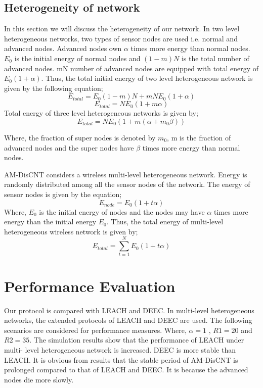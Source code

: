 \documentclass[journal]{IEEEtran}
\begin{document}
\subsection{Heterogeneity of network}
 In this section we will discuss the heterogeneity of our network. In two level heterogeneous networks, two types of sensor nodes are used i.e. normal and advanced nodes. Advanced nodes own $\alpha$ times more energy than normal nodes. $E_{0}$ is the initial energy of normal nodes and $(1-m)N$ is the total number of advanced nodes. mN number of advanced nodes are equipped with total energy of $E_{0}(1+\alpha)$. Thus, the total initial energy of two level heterogeneous network is given by the following equation;
\begin{equation}
E_{total} = E_{0}(1-m)N + mNE_{0}(1+\alpha)
\end{equation}
\begin{equation}
E_{total} = NE_{0}(1+m\alpha)
\end{equation}
 Total energy of three level heterogeneous networks is given by;
 \begin{equation}
E_{total} = NE_{0}(1+m(\alpha+m_{0}\beta))
\end{equation}

 Where, the fraction of super nodes is denoted by $m_{0}$, m is the fraction of advanced nodes and the super nodes have $\beta$ times more energy than normal nodes.

 AM-DisCNT considers a wireless multi-level heterogeneous network. Energy is randomly distributed among all the sensor nodes of the network. The energy of sensor nodes is given by the equation;
\begin{equation}
E_{node} = E_{0}(1+ t\alpha)
\end{equation}
 Where, $E_{0}$ is the initial energy of nodes and the nodes may have $\alpha$ times more energy than the initial energy $E_{0}$. Thus, the total energy of multi-level heterogeneous wireless network is given by;
\begin{equation}
E_{total} = \sum\limits_{t=1}^N E_{0} (1+ t\alpha)
\end{equation}



\section{Performance Evaluation}
  Our protocol is compared with LEACH and DEEC. In multi-level heterogeneous  networks, the extended protocols of LEACH and DEEC are used. The following scenarios are considered for performance measures. Where, $\alpha=1$ , $R1=20$ and $R2= 35$. The simulation results show that the performance of LEACH under multi- level heterogeneous network is increased. DEEC is more stable than LEACH. It is obvious from results that the stable period of AM-DisCNT is prolonged compared to that of LEACH and DEEC. It is because the advanced nodes die more slowly.
\end{document}
